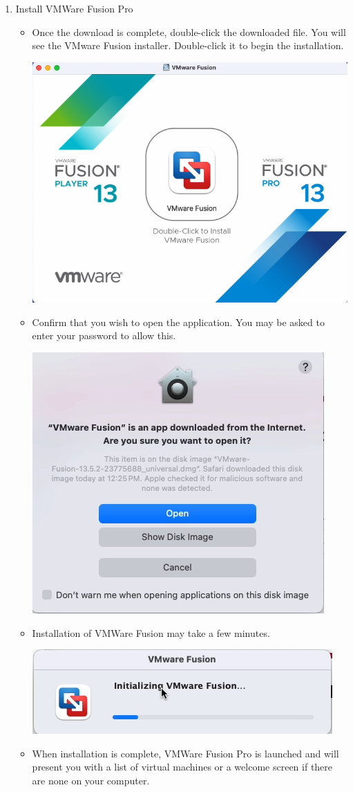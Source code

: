 \begin{enumerate}
\begin{itemize}
\begin{center}
		  \end{center}
    \end{itemize}
\item Install VMWare Fusion Pro
    \begin{itemize}
       \item Once the download is complete, double-click the downloaded file. You will see the VMware Fusion installer. Double-click it to begin the installation.
		  \begin{center}
		  \includegraphics[width=.5\textwidth]{screen29.png}
		  \end{center}
       \item Confirm that you wish to open the application. You may be asked to enter your password to allow this.
		  \begin{center}
		  \includegraphics[width=.33\textwidth]{screen30.png}
		  \end{center}
       \item Installation of VMWare Fusion may take a few minutes. 
		  \begin{center}
		  \includegraphics[width=.33\textwidth]{screen31.png}
		  \end{center}
       \item When installation is complete, VMWare Fusion Pro is launched and will present you with a list of virtual machines or a welcome screen if there are none on your computer.
          \begin{center}

\end{center}
\end{itemize}
\end{enumerate}
